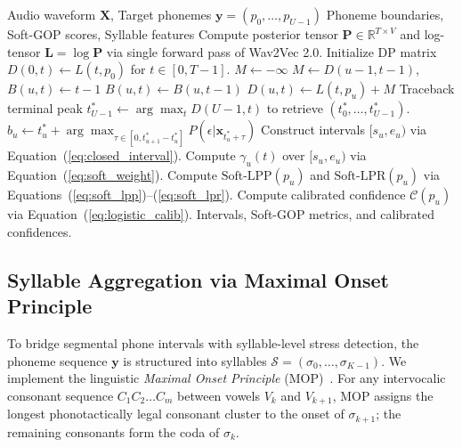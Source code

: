 \documentclass[10pt,conference]{IEEEtran}
\begin{document}
\begin{algorithm}[t]
\caption{Single-Pass Soft Peak Splitting and GOP}
\label{alg:soft_gop}
\begin{algorithmic}[1]
\REQUIRE Audio waveform $\mathbf{X}$, Target phonemes $\mathbf{y} = (p_0, \dots, p_{U-1})$
\ENSURE Phoneme boundaries, Soft-GOP scores, Syllable features
\STATE Compute posterior tensor $\mathbf{P} \in \mathbb{R}^{T \times V}$ and log-tensor $\mathbf{L} = \log \mathbf{P}$ via single forward pass of Wav2Vec 2.0.
\STATE Initialize DP matrix $D(0, t) \leftarrow L(t, p_0)$ for $t \in [0, T-1]$.
    \STATE $M \leftarrow -\infty$
            \STATE $M \leftarrow D(u-1, t-1)$, $B(u, t) \leftarrow t-1$
        \ELSE
            \STATE $B(u, t) \leftarrow B(u, t-1)$
        \ENDIF
        \STATE $D(u, t) \leftarrow L(t, p_u) + M$
    \ENDFOR
\ENDFOR
\STATE Traceback terminal peak $t_{U-1}^* \leftarrow \arg\max_t D(U-1, t)$ to retrieve $(t_0^*, \dots, t_{U-1}^*)$.
    \STATE $b_u \leftarrow t_u^* + \arg\max_{\tau \in [0, t_{u+1}^* - t_u^*]} P(\epsilon | \mathbf{x}_{t_u^* + \tau})$
\ENDFOR
\STATE Construct intervals $[s_u, e_u)$ via Equation~(\ref{eq:closed_interval}).
    \STATE Compute $\gamma_u(t)$ over $[s_u, e_u)$ via Equation~(\ref{eq:soft_weight}).
    \STATE Compute $\text{Soft-LPP}(p_u)$ and $\text{Soft-LPR}(p_u)$ via Equations~(\ref{eq:soft_lpp})--(\ref{eq:soft_lpr}).
    \STATE Compute calibrated confidence $\mathcal{C}(p_u)$ via Equation~(\ref{eq:logistic_calib}).
\ENDFOR
\RETURN Intervals, Soft-GOP metrics, and calibrated confidences.
\end{algorithmic}
\end{algorithm}

\subsection{Syllable Aggregation via Maximal Onset Principle}
\label{sec:mop}
To bridge segmental phone intervals with syllable-level stress detection, the phoneme sequence $\mathbf{y}$ is structured into syllables $\mathcal{S} = (\sigma_0, \dots, \sigma_{K-1})$. We implement the linguistic \textit{Maximal Onset Principle} (MOP)~\cite{clements1990role,selkirk1982syllable}. For any intervocalic consonant sequence $C_1 C_2 \dots C_m$ between vowels $V_k$ and $V_{k+1}$, MOP assigns the longest phonotactically legal consonant cluster to the onset of $\sigma_{k+1}$; the remaining consonants form the coda of $\sigma_k$.
\end{document}
